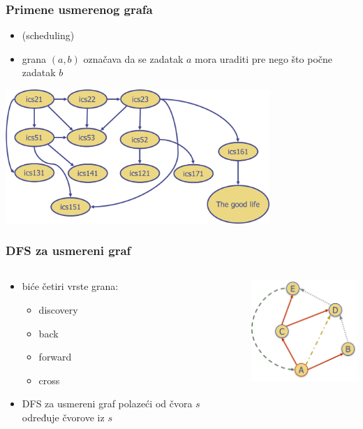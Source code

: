 \documentclass[compress]{beamer}
\begin{document}
\begin{frame}[fragile]
  \frametitle{Primene usmerenog grafa}
  \begin{itemize}
    \item {} (scheduling) 
    \item grana $(a,b)$ označava da se zadatak $a$ mora uraditi pre nego
      što počne zadatak $b$
  \end{itemize}
  \begin{center}
    \includegraphics[width=10cm]{asp-14-pic29.png}
  \end{center}
\end{frame}

\begin{frame}[fragile]
  \frametitle{DFS za usmereni graf}
  \begin{columns}
    \begin{column}[t]{6cm}
      \begin{itemize}
        \item biće četiri vrste grana:
        \begin{itemize}
          \item discovery
          \item back
          \item forward
          \item cross
        \end{itemize}
        \item DFS za usmereni graf polazeći od čvora $s$ određuje
          čvorove  iz $s$ 
      \end{itemize}
    \end{column}
    \begin{column}[t]{6cm}
      \begin{center}
        \includegraphics[width=5cm]{asp-14-pic30.png}
      \end{center}
    \end{column}
  \end{columns}
\end{frame}
\end{document}
